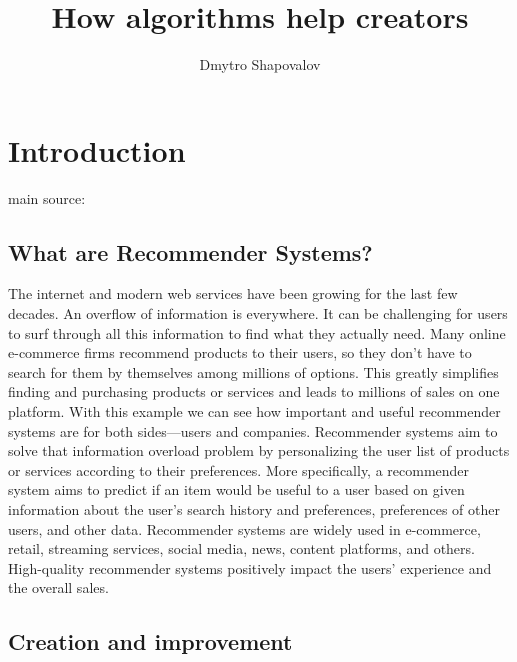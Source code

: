 \documentclass[12pt]{article}
\title{How algorithms help creators}
\author{Dmytro Shapovalov}
\begin{document}
\maketitle

\section{Introduction}
main source: \cite{0}

\subsection{What are Recommender Systems?}

The internet and modern web services have been growing for the last few decades. An overflow of information is everywhere. It can be challenging for users to surf through all this information to find what they actually need. Many online e-commerce firms recommend products to their users, so they don’t have to search for them by themselves among millions of options. This greatly simplifies finding and purchasing products or services and leads to millions of sales on one platform. With this example we can see how important and useful recommender systems are for both sides—users and companies. Recommender systems aim to solve that information overload problem by personalizing the user list of products or services according to their preferences. More specifically, a recommender system aims to predict if an item would be useful to a user based on given information about the user’s search history and preferences, preferences of other users, and other data. Recommender systems are widely used in e-commerce, retail, streaming services, social media, news, content platforms, and others. High-quality recommender systems positively impact the users’ experience and the overall sales.
\cite{1.1}
\cite{1.2}

\subsection{Creation and improvement}
\end{document}
